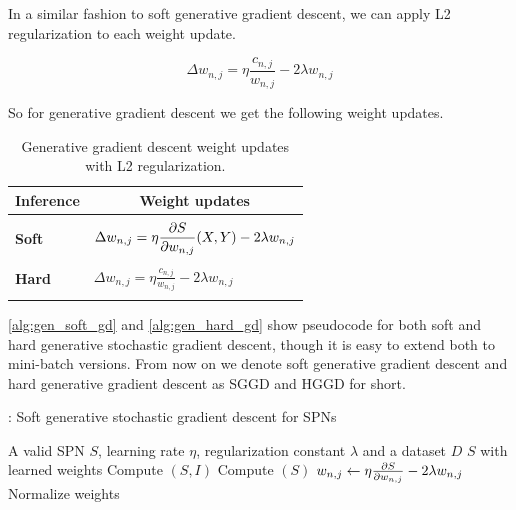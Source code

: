 In a similar fashion to soft generative gradient descent, we can apply L2 regularization to each
weight update.

\begin{equation}
  \Delta w_{n,j}=\eta\frac{c_{n,j}}{w_{n,j}}-2\lambda w_{n,j}
\end{equation}

So for generative gradient descent we get the following weight updates.

\begin{table}[h]
  \centering
  \begin{tabular}{l|l}
    \hline
    \multicolumn{1}{c}{\bfseries Inference} & \multicolumn{1}{c}{\bfseries Weight updates}\\
    \hline & \\
    \textbf{Soft} & \(\displaystyle \Delta w_{n,j}=\eta\frac{\partial S}{\partial w_{n,j}}(X, Y)-2\lambda w_{n,j} \) \\
    & \\
    \textbf{Hard} & \(\displaystyle \Delta w_{n,j}=\eta\frac{c_{n,j}}{w_{n,j}}-2\lambda w_{n,j} \) \\
    & \\
    \hline
  \end{tabular}
  \caption{Generative gradient descent weight updates with L2
    regularization.\label{tab:generative_weight_updates}}
\end{table}

\autoref{alg:gen_soft_gd} and \autoref{alg:gen_hard_gd} show pseudocode for both soft and hard
generative stochastic gradient descent, though it is easy to extend both to mini-batch versions.
From now on we denote soft generative gradient descent and hard generative gradient descent as SGGD
and HGGD for short.

\begin{algorithm}[H]
  \caption{: Soft generative stochastic gradient descent for SPNs\label{alg:gen_soft_gd}}
  \begin{algorithmic}[1]
    \Require A valid SPN $S$, learning rate $\eta$, regularization constant $\lambda$ and a dataset $D$
    \Ensure $S$ with learned weights
    \Repeat%
        \State Compute $(S, I)$
        \State Compute $(S)$
          \State $w_{n,j}\gets\eta\frac{\partial S}{\partial w_{n,j}}-2\lambda w_{n,j}$
        \EndFor%
        \State Normalize weights
      \EndFor%
  \end{algorithmic}
\end{algorithm}

